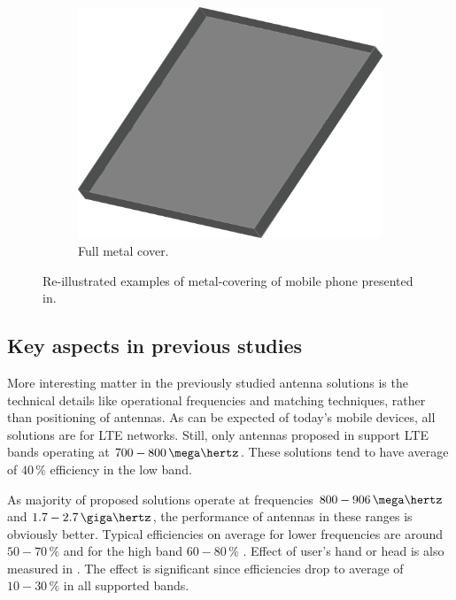 \begin{figure}[H]
\begin{subfigure}[b]{0.3\textwidth}
        \includegraphics[width=\textwidth]{img/metal_cover_full.eps}
        \caption{Full metal cover.}
        \label{fig:full_cover}
    \end{subfigure}
    \caption{Re-illustrated examples of metal-covering of mobile phone presented in\cite{chen_compact_lte}.}
    \label{fig:metal_covers}
\end{figure}



\subsection{Key aspects in previous studies}
\label{sec:key_aspects}
More interesting matter in the previously studied antenna solutions is the technical details like operational frequencies and matching techniques, rather than positioning of antennas. As can be expected of today's mobile devices, all solutions are for LTE networks. Still, only antennas proposed in \cite{stanley_lte_mimo, son_wideband_mimo, chen_compact_lte, chen_metal_frame,valkonen_multifeed} support LTE bands operating at $700-800\,\mega\hertz$. These solutions tend to have average of $40\,\%$ efficiency in the low band. 

As majority of proposed solutions operate at frequencies $800-906\,\mega\hertz$ and $1.7-2.7\,\giga\hertz$, the performance of antennas in these ranges is obviously better. Typical efficiencies on average for lower frequencies are around $50-70\,\%$ and for the high band $60-80\,\%$ \cite{ban_dual_loop,chen_compact_lte,son_wideband_mimo,chen_metal_frame,zhong_pier}. Effect of user's hand or head is also measured in \cite{zhong_pier, chen_metal_frame,ban_dual_loop,reconf_narrow,hybrid,hepta_ifa}. The effect is significant since efficiencies drop to average of $10-30\,\%$ in all supported bands. 

